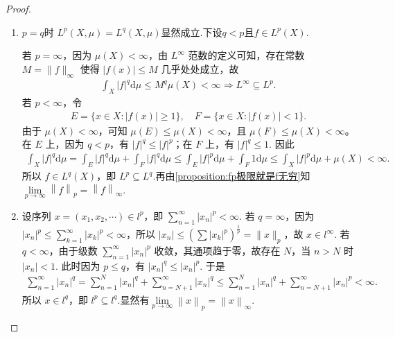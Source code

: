 \documentclass[../../main.tex]{subfiles}%
\begin{document}
\begin{proof}
\begin{enumerate}[(1)]
\item $p=q$时 \(L^p(X, \mu) = L^q(X, \mu)\)显然成立.下设$q<p$且\(f \in L^p(X).\)

若 \(p = \infty\)，因为 \(\mu(X) < \infty\)，由 \(L^\infty\) 范数的定义可知，存在常数 \(M = \|f\|_\infty\) 使得 \(|f(x)| \leqslant M\) 几乎处处成立，故
\begin{align*}
\int_X |f|^q \mathrm{d}\mu \leqslant M^q \mu(X) < \infty\Longrightarrow L^\infty \subseteq L^p.
\end{align*}
若 \(p < \infty\)，令 
\begin{align*}
E=\{x\in X:|f(x)|\geqslant 1\},\quad F=\{x\in X:|f(x)|<1\}.
\end{align*}
由于 \(\mu(X) < \infty\)，可知 \(\mu(E) \leqslant \mu(X) < \infty\)，且 \(\mu(F) \leqslant \mu(X) < \infty\)。在 \(E\) 上，因为 \(q < p\)，有 \(|f|^q \leqslant |f|^p\)；在 \(F\) 上，有 \(|f|^q \leqslant 1.\)
因此
\begin{align*}
\int_X |f|^q \mathrm{d}\mu = \int_E |f|^q \mathrm{d}\mu + \int_F |f|^q \mathrm{d}\mu \leqslant \int_E |f|^p \mathrm{d}\mu + \int_F 1 \mathrm{d}\mu \leqslant \int_X |f|^p \mathrm{d}\mu + \mu(X) < \infty.
\end{align*}
所以 \(f \in L^q(X)\)，即 \(L^p \subseteq L^q.\)再由\cref{proposition:fp极限就是f无穷}知$\underset{p\rightarrow \infty}{\lim}\left\| f \right\| _p=\left\| f \right\| _{\infty}.$

\item 设序列 \(x = (x_1, x_2, \cdots) \in l^p\)，即 \(\sum\limits_{n=1}^{\infty} |x_n|^p < \infty.\)
若 \(q = \infty\)，因为 \(|x_n|^p \leqslant \sum\limits_{k=1}^{\infty} |x_k|^p < \infty\)，所以 \(|x_n| \leqslant (\sum |x_k|^p)^{\frac{1}{p}} = \|x\|_p\)，故 \(x \in l^\infty.\)
若 \(q < \infty\)，由于级数 \(\sum\limits_{n=1}^{\infty} |x_n|^p\) 收敛，其通项趋于零，故存在 \(N\)，当 \(n > N\) 时 \(|x_n| < 1\). 此时因为 \(p \leqslant q\)，有 \(|x_n|^q \leqslant |x_n|^p.\)
于是
\begin{align*}
\sum\limits_{n=1}^{\infty} |x_n|^q = \sum\limits_{n=1}^{N} |x_n|^q + \sum\limits_{n=N+1}^{\infty} |x_n|^q \leqslant \sum\limits_{n=1}^{N} |x_n|^q + \sum\limits_{n=N+1}^{\infty} |x_n|^p < \infty.
\end{align*}
所以 \(x \in l^q\)，即 \(l^p \subseteq l^q.\)显然有$\underset{p\rightarrow \infty}{\lim}\left\| x \right\| _p=\left\| x \right\| _{\infty}.$


\end{enumerate}
\end{proof}
\end{document}
